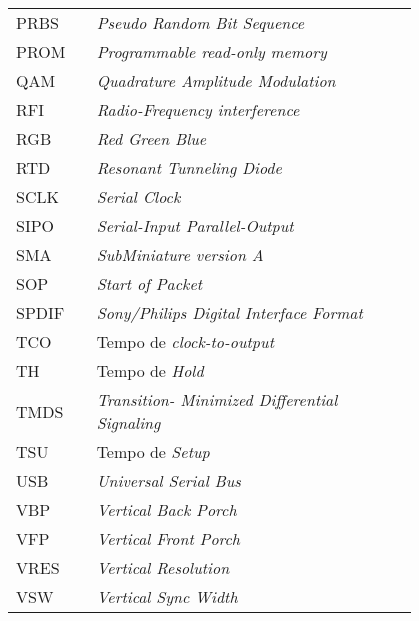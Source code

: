 \begin{flushleft}
\begin{longtable}{l p{0.8\linewidth}}
PRBS      & \textit{Pseudo Random Bit Sequence}                                                                   \\
PROM      & \textit{Programmable read-only memory}                                                                   \\
QAM       & \textit{Quadrature Amplitude Modulation}                                                              \\
RFI       & \textit{Radio-Frequency interference }                                                                \\
RGB       & \textit{Red Green Blue }                                                                              \\
RTD       & \textit{Resonant Tunneling Diode }                                                                    \\
SCLK      & \textit{Serial Clock }                                                                                \\
SIPO      & \textit{Serial-Input Parallel-Output    }                                                             \\
SMA       &\textit{SubMiniature version A }                                                                      \\
SOP       & \textit{Start of Packet}                                                                              \\
SPDIF     & \textit{Sony/Philips Digital Interface Format }                                                       \\
TCO       & Tempo de \textit{clock-to-output }                                                                    \\
TH        & Tempo de \textit{Hold }                                                                               \\
TMDS      & \textit{Transition- Minimized Differential Signaling}                                                 \\
TSU       & Tempo de \textit{Setup}                                                                               \\
USB       & \textit{Universal Serial Bus}                                                                         \\
VBP       & \textit{Vertical Back Porch}                                                                          \\
VFP       & \textit{Vertical Front Porch}                                                                         \\
VRES      & \textit{Vertical Resolution }                                                                         \\
VSW       & \textit{Vertical Sync Width}                                                                         
\end{longtable}
\end{flushleft}

